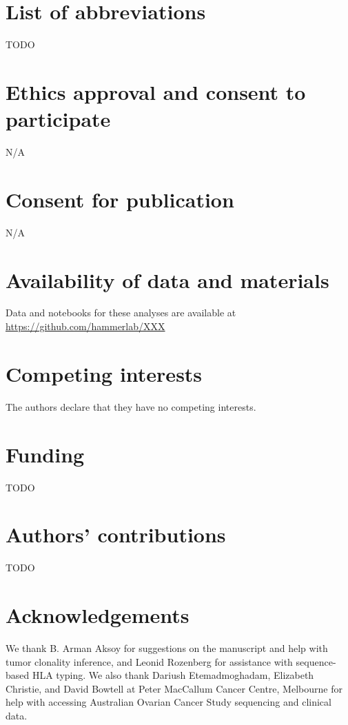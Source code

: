 \section{List of abbreviations}
TODO

\section{Ethics approval and consent to participate}
N/A

\section{Consent for publication}
N/A

\section{Availability of data and materials}
Data and notebooks for these analyses are available at \url{https://github.com/hammerlab/XXX}

\section{Competing interests}
The authors declare that they have no competing interests.

\section{Funding}
TODO

\section{Authors' contributions}
TODO

\section{Acknowledgements}
We thank B. Arman Aksoy for suggestions on the manuscript and help with tumor clonality inference, and Leonid Rozenberg for assistance with sequence-based HLA typing. We also thank Dariush Etemadmoghadam, Elizabeth Christie, and David Bowtell at Peter MacCallum Cancer Centre, Melbourne for help with accessing Australian Ovarian Cancer Study sequencing and clinical data.
